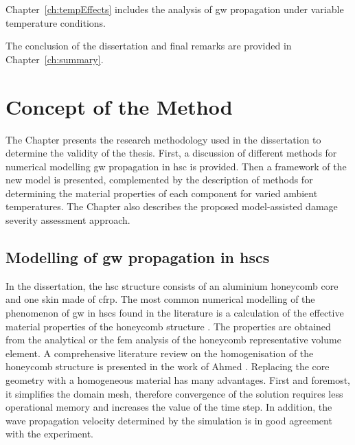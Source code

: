 \documentclass[11pt,a4paper,final]{report}
\theoremstyle{plain}
\begin{document}
Chapter~\ref{ch:tempEffects} includes the analysis of \ac{gw} propagation under variable temperature conditions.

The conclusion of the dissertation and final remarks are provided in Chapter~\ref{ch:summary}.

\clearpage{}
\clearpage{}

\chapter[Concept of the Method]{Concept of the Method}
\label{ch:method}

The Chapter presents the research methodology used in the dissertation to determine the validity of the thesis. 
First, a discussion of different methods for numerical modelling \ac{gw} propagation in \ac{hsc} is provided. 
Then a framework of the new model is presented, complemented by the description of methods for determining the material properties of each component for varied ambient temperatures.
The Chapter also describes the proposed model-assisted damage severity assessment approach.
\section{Modelling of \acl{gw} propagation in \aclp{hsc}}
\label{sec:modelling}





In the dissertation, the \ac{hsc} structure consists of an aluminium honeycomb core and one skin made of \ac{cfrp}.
The most common numerical modelling of the phenomenon of \ac{gw} in \acp{hsc} found in the literature is a calculation of the effective material properties of the honeycomb structure \cite{baid2015dispersion, mustapha2014leaky, qi2008ultrasonic,  shi1995derivation, sikdar2016guided}.
The properties are obtained from the analytical \cite{gibson1982mechanics, malek2015effective} or the \ac{fem} \cite{catapano2014multi, chen2014analysis} analysis of the honeycomb representative volume element.
A comprehensive literature review on the homogenisation of the honeycomb structure is presented in the work of Ahmed \cite{ahmed2019homogenization}.
Replacing the core geometry with a homogeneous material has many advantages.
First and foremost, it simplifies the domain mesh, therefore convergence of the solution requires less operational memory and increases the value of the time step.
In addition, the wave propagation velocity determined by the simulation is in good agreement with the experiment.
\end{document}
